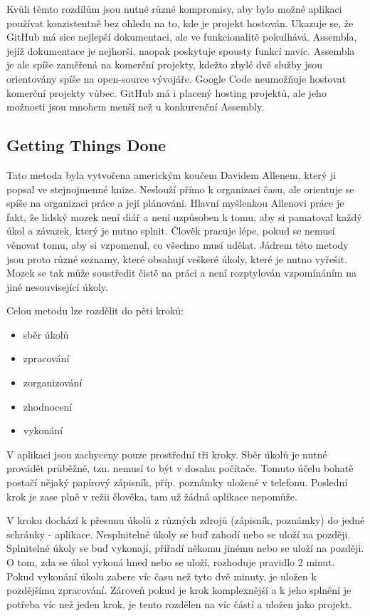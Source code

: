 Kvůli těmto rozdílům jsou nutné různé kompromisy, aby bylo možné aplikaci používat konzistentně bez ohledu na to, kde je projekt hostován. Ukazuje se, že GitHub má sice nejlepší dokumentaci, ale ve funkcionalitě pokulhává. Assembla, jejíž dokumentace je nejhorší, naopak poskytuje spousty funkcí navíc. Assembla je ale spíše zaměřená na komerční projekty, kdežto zbylé dvě služby jsou orientovány spíše na open-source vývojáře. Google Code neumožňuje hostovat komerční projekty vůbec. GitHub má i placený hosting projektů, ale jeho možnosti jsou mnohem menší než u konkurenční Assembly.

\subsection{Getting Things Done}

Tato metoda byla vytvořena americkým koučem Davidem Allenem, který ji popsal ve stejnojmenné knize\cite{gtd:book}. Neslouží přímo k organizaci času, ale orientuje se spíše na organizaci práce a její plánování. Hlavní myšlenkou Allenovi práce je fakt, že lidský mozek není diář a není uzpůsoben k tomu, aby si pamatoval každý úkol a závazek, který je nutno splnit. Člověk pracuje lépe, pokud se nemusí věnovat tomu, aby si vzpomenul, co všechno musí udělat. Jádrem této metody jsou proto různé seznamy, které obsahují veškeré úkoly, které je nutno vyřešit. Mozek se tak může soustředit čistě na práci a není rozptylován vzpomínáním na jiné nesouvisející úkoly.

Celou metodu lze rozdělit do pěti kroků\cite{gtd:wiki}:

\begin{itemize}
\item sběr úkolů
\item zpracování
\item zorganizování
\item zhodnocení
\item vykonání
\end{itemize}

V aplikaci jsou zachyceny pouze prostřední tři kroky. Sběr úkolů je nutné provádět průběžně, tzn. nemusí to být v dosahu počítače. Tomuto účelu bohatě postačí nějaký papírový zápisník, příp. poznámky uložené v telefonu. Poslední krok  je zase plně v režii člověka, tam už žádná aplikace nepomůže.

V kroku  dochází k přesunu úkolů z různých zdrojů (zápisník, poznámky) do jedné schránky - aplikace. Nesplnitelné úkoly se buď zahodí nebo se uloží na později. Splnitelné úkoly se buď vykonají, přiřadí někomu jinému nebo se uloží na později. O tom, zda se úkol vykoná hned nebo se uloží, rozhoduje pravidlo 2 minut. Pokud vykonání úkolu zabere víc času než tyto dvě minuty, je uložen k pozdějšímu zpracování. Zároveň pokud je krok komplexnější a k jeho splnění je potřeba víc než jeden krok, je tento rozdělen na víc částí a uložen jako projekt.

